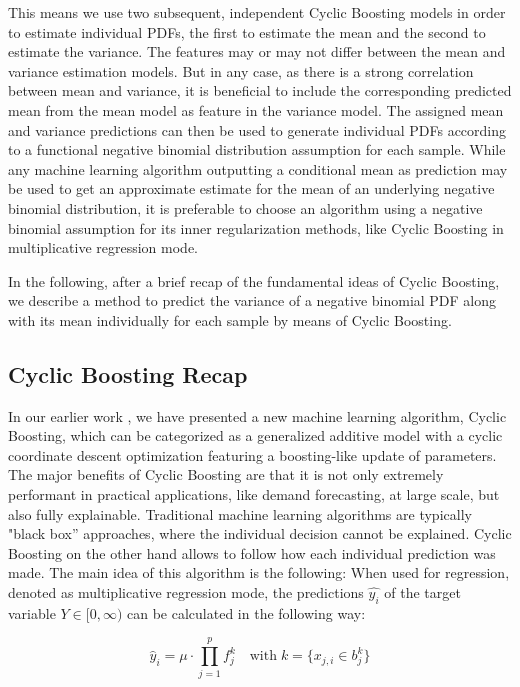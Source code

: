 \documentclass[BCOR=1mm, DIV=calc,10pt,
twoside=true,
twocolumn,
headings=normal]{scrartcl}
\begin{document}
This means we use two subsequent, independent Cyclic Boosting models in order to estimate individual PDFs, the first to estimate the mean and the second to estimate the variance. The features may or may not differ between the mean and variance estimation models. But in any case, as there is a strong correlation between mean and variance, it is beneficial to include the corresponding predicted mean from the mean model as feature in the variance model. The assigned mean and variance predictions can then be used to generate individual PDFs according to a functional negative binomial distribution assumption for each sample. While any machine learning algorithm outputting a conditional mean as prediction may be used to get an approximate estimate for the mean of an underlying negative binomial distribution, it is preferable to choose an algorithm using a negative binomial assumption for its inner regularization methods, like Cyclic Boosting in multiplicative regression mode.

In the following, after a brief recap of the fundamental ideas of Cyclic Boosting, we describe a method to predict the variance of a negative binomial PDF along with its mean individually for each sample by means of Cyclic Boosting.

\subsection{Cyclic Boosting Recap}
\label{sec:CB}

In our earlier work \cite{Wick2019}, we have presented a new machine learning algorithm, Cyclic Boosting, which can be categorized as a generalized additive model with a cyclic coordinate descent optimization featuring a boosting-like update of parameters. The major benefits of Cyclic Boosting are that it is not only extremely performant in practical applications, like demand forecasting, at large scale, but also fully explainable. Traditional machine learning algorithms are typically "black box'' approaches, where the individual decision cannot be explained. Cyclic Boosting on the other hand allows to follow how each individual prediction was made. The main idea of this algorithm is the following: When used for regression, denoted as multiplicative regression mode, the predictions $\hat{y_i}$ of the  target variable $Y \in [0,\infty)$ can be calculated in the following way:

\begin{equation} \label{eqn:cb}
\hat{y}_i = \mu \cdot \prod \limits_{j=1}^p f^k_j \quad \text{with}\; k=\{ x_{j,i} \in b^k_j\}
\end{equation}
\end{document}
